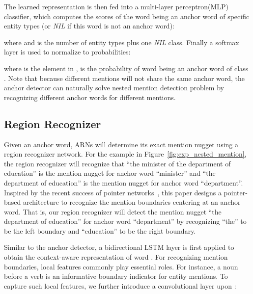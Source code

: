 \documentclass[11pt,a4paper]{article}
\begin{document}
\begin{small}

\end{small}The learned representation  is then fed into a multi-layer perceptron(MLP) classifier, which computes the scores  of the word  being an anchor word of specific entity types (or \emph{NIL} if this word is not an anchor word):

\begin{small}

\end{small}where  and  is the number of entity types plus one \emph{NIL} class. Finally a softmax layer is used to normalize  to probabilities:

\begin{small}

\end{small}where  is the  element in ,  is the probability of word  being an anchor word of class .
Note that because different mentions will not share the same anchor word, the anchor detector can naturally solve nested mention detection problem by recognizing different anchor words for different mentions.

\subsection{Region Recognizer}
Given an anchor word, ARNs will determine its exact mention nugget using a region recognizer network. For the example in Figure~\ref{fig:exp_nested_mention}, the region recognizer will recognize that ``the minister of the department of education'' is the mention nugget for anchor word ``minister'' and ``the department of education'' is the mention nugget for anchor word ``department''. Inspired by the recent success of pointer networks~\cite{vinyals2015pointer,wang2016machine}, this paper designs a pointer-based architecture to recognize the mention boundaries centering at an anchor word. That is, our region recognizer will detect the mention nugget ``the department of education'' for anchor word ``department'' by recognizing ``the'' to be the left boundary and ``education'' to be the right boundary.

Similar to the anchor detector, a bidirectional LSTM layer is first applied to obtain the context-aware representation  of word . For recognizing mention boundaries, local features commonly play essential roles. For instance, a noun before a verb is an informative boundary indicator for entity mentions. To capture such local features, we further introduce a convolutional layer upon :
\end{document}
